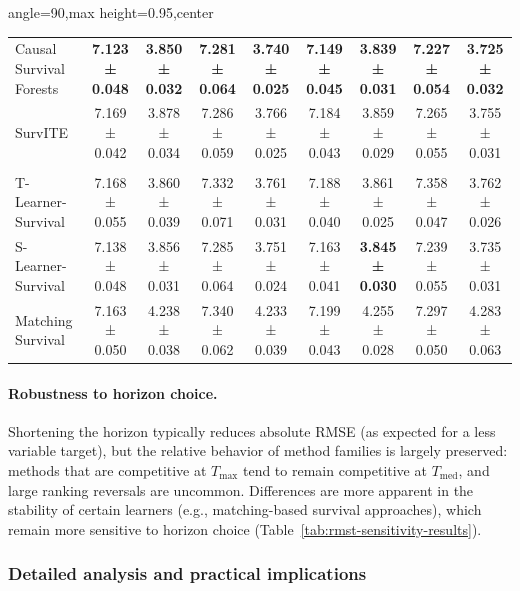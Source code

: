 \documentclass{article} %
\begin{document}
\begin{table}[!ht]
\begin{adjustbox}{angle=90,max height=0.95\textheight,center}
\begin{minipage}{\textheight}
\begin{subtable}{\linewidth}
\begin{tabular}{l cc cc cc cc}
        Causal Survival Forests & \textbf{7.123 ± 0.048} & \textbf{3.850 ± 0.032} & \textbf{7.281 ± 0.064} & \textbf{3.740 ± 0.025} & \textbf{7.149 ± 0.045} & \textbf{3.839 ± 0.031} & \textbf{7.227 ± 0.054} & \textbf{3.725 ± 0.032} \\
        SurvITE & 7.169 ± 0.042 & 3.878 ± 0.034 & 7.286 ± 0.059 & 3.766 ± 0.025 & 7.184 ± 0.043 & 3.859 ± 0.029 & 7.265 ± 0.055 & 3.755 ± 0.031 \\ 
        \addlinespace
        \multicolumn{7}{l}{\textit{Survival Meta-Learners}} \\
        T-Learner-Survival & 7.168 ± 0.055 & 3.860 ± 0.039 & 7.332 ± 0.071 & 3.761 ± 0.031 & 7.188 ± 0.040 & 3.861 ± 0.025 & 7.358 ± 0.047 & 3.762 ± 0.026 \\ 
        S-Learner-Survival & 7.138 ± 0.048 & 3.856 ± 0.031 & 7.285 ± 0.064 & 3.751 ± 0.024 & 7.163 ± 0.041 & \textbf{3.845 ± 0.030} & 7.239 ± 0.055 & 3.735 ± 0.031 \\
        Matching Survival & 7.163 ± 0.050 & 4.238 ± 0.038 & 7.340 ± 0.062 & 4.233 ± 0.039 & 7.199 ± 0.043 & 4.255 ± 0.028 & 7.297 ± 0.050 & 4.283 ± 0.063 \\ 
        \bottomrule
    \end{tabular}
    \end{subtable}
    \end{minipage}
    \end{adjustbox}
\end{table}



\paragraph{Robustness to horizon choice.}
Shortening the horizon typically reduces absolute RMSE (as expected for a less variable target), but the relative behavior of method families is largely preserved: methods that are competitive at $T_{\max}$ tend to remain competitive at $T_{\text{med}}$, and large ranking reversals are uncommon. Differences are more apparent in the stability of certain learners (e.g., matching-based survival approaches), which remain more sensitive to horizon choice (Table~\ref{tab:rmst-sensitivity-results}).



\subsubsection{Detailed analysis and practical implications}
\label{app:semi-synthetic-detailed}
\end{document}
